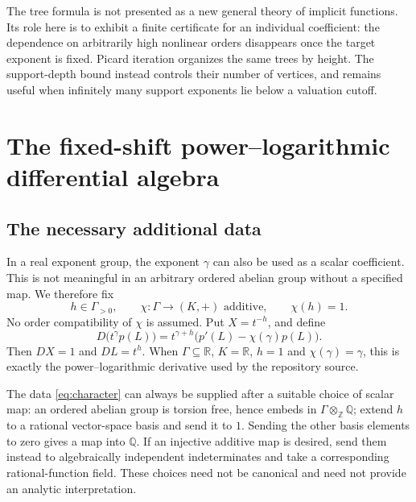 \documentclass[11pt,a4paper]{article}
\theoremstyle{definition}
\theoremstyle{remark}
\newcommand{\Z}{\mathbb Z}
\newcommand{\Q}{\mathbb Q}
\newcommand{\R}{\mathbb R}
\begin{document}
The tree formula is not presented as a new general theory of implicit
functions. Its role here is to exhibit a finite certificate for an
individual coefficient: the dependence on arbitrarily high nonlinear
orders disappears once the target exponent is fixed. Picard iteration
organizes the same trees by height. The support-depth bound instead
controls their number of vertices, and remains useful when infinitely many
support exponents lie below a valuation cutoff.

\section{The fixed-shift power--logarithmic differential algebra}
\label{sec:differential}

\subsection{The necessary additional data}
In a real exponent group, the exponent $\gamma$ can also be used as a scalar
coefficient. This is not meaningful in an arbitrary ordered abelian group
without a specified map. We therefore fix
\begin{equation}\label{eq:character}
 h\in\Gamma_{>0},\qquad \chi:\Gamma\longrightarrow(K,+)
 \text{ additive},\qquad \chi(h)=1.
\end{equation}
No order compatibility of $\chi$ is assumed. Put $X=t^{-h}$, and define
\begin{equation}\label{eq:D}
 D\bigl(t^\gamma p(L)\bigr)
 =t^{\gamma+h}\bigl(p'(L)-\chi(\gamma)p(L)\bigr).
\end{equation}
Then $DX=1$ and $DL=t^h$. When $\Gamma\subseteq\R$, $K=\R$, $h=1$ and
$\chi(\gamma)=\gamma$, this is exactly the power--logarithmic derivative
used by the repository source.

The data \eqref{eq:character} can always be supplied after a suitable choice
of scalar map: an ordered abelian group is torsion free, hence embeds in
$\Gamma\otimes_\Z\Q$; extend $h$ to a rational vector-space basis and send
it to $1$. Sending the other basis elements to zero gives a map into $\Q$.
If an injective additive map is desired, send them instead to algebraically
independent indeterminates and take a corresponding rational-function
field. These choices need not be canonical and need not provide an
analytic interpretation.
\end{document}
